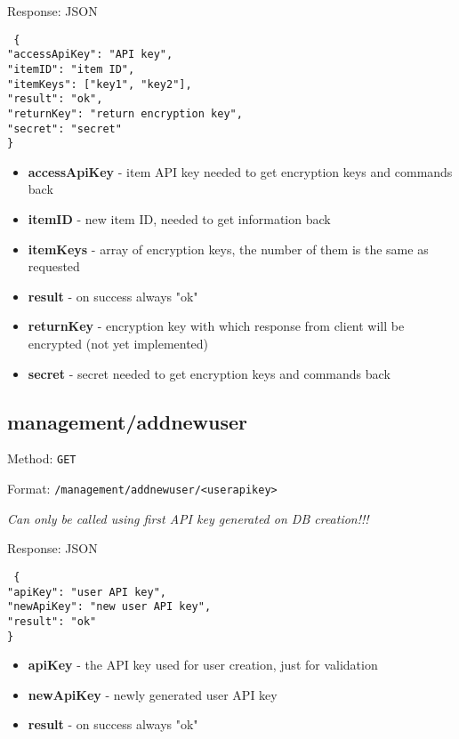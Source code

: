 Response: JSON

\texttt{
  \{\\
  "accessApiKey": "API key",\\
  "itemID": "item ID", \\
  "itemKeys": {["key1", "key2"]}, \\
  "result": "ok", \\
  "returnKey": "return encryption key", \\
  "secret": "secret"\\
  \}
}

\begin{itemize}
  \item \textbf{accessApiKey} - item API key needed to get encryption keys and commands back
  \item \textbf{itemID} - new item ID, needed to get information back
  \item \textbf{itemKeys} - array of encryption keys, the number of them is the same as requested
  \item \textbf{result} - on success always "ok"
  \item \textbf{returnKey} - encryption key with which response from client will be encrypted (not yet implemented)
  \item \textbf{secret} - secret needed to get encryption keys and commands back
\end{itemize}

\subsection{management/addnewuser}
Method: \texttt{GET}

Format: \texttt{/management/addnewuser/<userapikey>}

\emph{Can only be called using first API key generated on DB creation!!!}

Response: JSON

\texttt{
  \{\\
  "apiKey": "user API key", \\
  "newApiKey": "new user API key", \\
  "result": "ok"\\
  \}
}

\begin{itemize}
  \item \textbf{apiKey} - the API key used for user creation, just for validation
  \item \textbf{newApiKey} - newly generated user API key
  \item \textbf{result} - on success always "ok"
\end{itemize}


